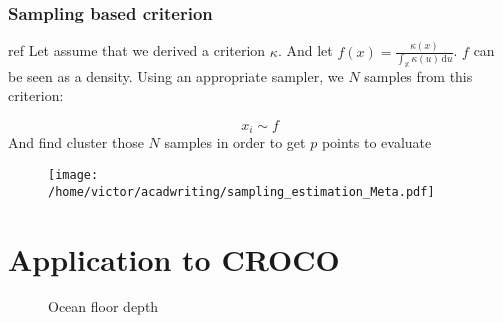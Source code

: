 \documentclass[a4paper,11pt]{article}
\newcommand{\Xspace}{\mathbb{X}}
\theoremstyle{defi}
\numberwithin{thmCounter}{section}
\begin{document}
\subsubsection{Sampling based criterion}
\label{sec:sampling_based_criterion}
ref \cite{dubourg_reliability-based_2011}
Let assume that we derived a criterion $\kappa$. And let $f(x) = \frac{\kappa(x)}{\int_{\Xspace}\kappa(u)\,\mathrm{d}u}$. $f$ can be seen as a density.
  Using an appropriate sampler, we $N$ samples from this criterion:
  

\begin{equation*}
  x_i \sim f
\end{equation*}
And find cluster those $N$ samples in order to get $p$ points to evaluate
 

\begin{figure}[ht]
  \centering
  \texttt{[image: /home/victor/acadwriting/sampling\_estimation\_Meta.pdf]}
  \caption{\label{fig:label} }
\end{figure}


\section{Application to CROCO}
\label{sec:croco_application}

\begin{figure}[!h]
  \centering
  \scalebox{0.6}{}
  \caption{Ocean floor depth}
\end{figure}


\end{document}
